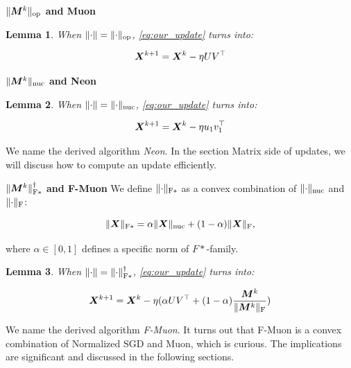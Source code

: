 \documentclass{article} %
\newtheorem{lemma}{Lemma}
\newcommand{\norm}[1]{\lVert #1\rVert}
\DeclarePairedDelimiter{\normf}{\|}{\|_\mathrm{F}}
\DeclarePairedDelimiter{\normfstar}{\|}{\|_\mathrm{F*}}
\DeclarePairedDelimiter{\norms}{\|}{\|_{\mathrm{op}}}
\DeclarePairedDelimiter{\normn}{\|}{\|_{\mathrm{nuc}}}
\begin{document}
    {\bf $\norms{\mM^{k}}$ and Muon}
    \begin{lemma}\label{lemma:muon_update}
        When $\norm{\cdot} = \norms{\cdot}$, \cref{eq:our_update} turns into:

        \begin{equation}\label{eq:muon_update}
            {\bm{X}}^{k+1} = {\bm{X}}^{k} - \eta U V^\top
        \end{equation}
    \end{lemma}    

    {\bf $\normn{\mM^{k}}$ and Neon}
    \begin{lemma}\label{lemma:neon_update}
        When $\norm{\cdot} = \normn{\cdot}$, \cref{eq:our_update} turns into:

        \begin{equation}\label{eq:neon_update}
            {\bm{X}}^{k+1} = {\bm{X}}^{k} - \eta u_1 v_1^\top
        \end{equation}
    \end{lemma}
        We name the derived algorithm \emph{Neon}. In the section Matrix side of updates, we will discuss how to compute an update efficiently.

    {\bf $\normfstar{\mM^{k}}^\dagger$ and F-Muon}
        We define $\normfstar{\cdot}$ as a convex combination of $\normn{\cdot}$ and $\normf{\cdot}$:

        \begin{equation}\label{eq:fstar_norm}
            \normfstar{\mX} = \alpha \normn{\mX} + (1-\alpha)\normf{\mX},
        \end{equation}

        where $\alpha \in [0, 1]$ defines a specific norm of $F*$-family.

    \begin{lemma}\label{lemma:nsgd_muon_update}
        When $\norm{\cdot} = \normfstar{\cdot}^\dagger$, \cref{eq:our_update} turns into:

        \begin{equation}\label{eq:nsgd_muon_update}
            \mX^{k+1} = \mX^{k} - \eta (\alpha U V^\top + (1-\alpha)\frac{\mM^k}{\normf{\mM^k}})
        \end{equation}
    \end{lemma}

        We name the derived algorithm \emph{F-Muon}. It turns out that F-Muon is a convex combination of Normalized SGD and Muon, which is curious. The implications are significant and discussed in the following sections.
\end{document}
